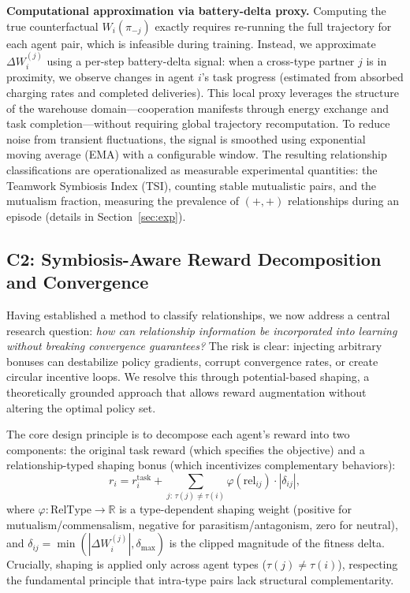 \documentclass[Afour,sageh,times]{sagej}
\begin{document}
\textbf{Computational approximation via battery-delta proxy.}
Computing the true counterfactual $W_i(\pi_{-j})$ exactly requires re-running the full trajectory for each agent pair, which is infeasible during training. Instead, we approximate $\Delta W_i^{(j)}$ using a per-step battery-delta signal: when a cross-type partner $j$ is in proximity, we observe changes in agent $i$'s task progress (estimated from absorbed charging rates and completed deliveries). This local proxy leverages the structure of the warehouse domain---cooperation manifests through energy exchange and task completion---without requiring global trajectory recomputation. To reduce noise from transient fluctuations, the signal is smoothed using exponential moving average (EMA) with a configurable window. The resulting relationship classifications are operationalized as measurable experimental quantities: the Teamwork Symbiosis Index (TSI), counting stable mutualistic pairs, and the mutualism fraction, measuring the prevalence of $(+,+)$ relationships during an episode (details in Section~\ref{sec:exp}).

\subsection{C2: Symbiosis-Aware Reward Decomposition and Convergence}
\label{sec:c2}

Having established a method to classify relationships, we now address a central research question: \emph{how can relationship information be incorporated into learning without breaking convergence guarantees?} The risk is clear: injecting arbitrary bonuses can destabilize policy gradients, corrupt convergence rates, or create circular incentive loops. We resolve this through potential-based shaping, a theoretically grounded approach that allows reward augmentation without altering the optimal policy set.

The core design principle is to decompose each agent's reward into two components: the original task reward (which specifies the objective) and a relationship-typed shaping bonus (which incentivizes complementary behaviors):
\begin{equation}
    r_i = r_i^{\mathrm{task}} + \sum_{j:\,\tau(j)\neq\tau(i)}
          \varphi(\mathrm{rel}_{ij}) \cdot |\delta_{ij}|,
    \label{eq:c2_reward}
\end{equation}
where $\varphi : \mathrm{RelType} \to \mathbb{R}$ is a type-dependent shaping weight (positive for mutualism/commensalism, negative for parasitism/antagonism, zero for neutral), and $\delta_{ij} = \min(|\Delta W_i^{(j)}|, \delta_{\max})$ is the clipped magnitude of the fitness delta. Crucially, shaping is applied only across agent types ($\tau(j) \neq \tau(i)$), respecting the fundamental principle that intra-type pairs lack structural complementarity.
\end{document}
